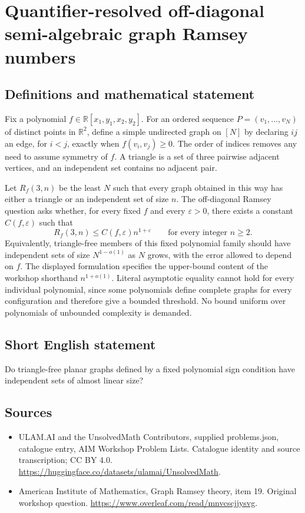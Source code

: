 \documentclass[11pt,a4paper]{article}
\begin{document}
\section*{Quantifier-resolved off-diagonal semi-algebraic graph Ramsey numbers}\label{statement}

\subsection{Definitions and mathematical statement}
Fix a polynomial $f\in\mathbb R[x_1,y_1,x_2,y_2]$.
For an ordered sequence $P=(v_1,\ldots,v_N)$ of distinct points in $\mathbb R^2$, define a simple undirected graph on $[N]$ by declaring $ij$ an edge, for $i<j$, exactly when $f(v_i,v_j)\geq0$.
The order of indices removes any need to assume symmetry of $f$.
A triangle is a set of three pairwise adjacent vertices, and an independent set contains no adjacent pair.

Let $R_f(3,n)$ be the least $N$ such that every graph obtained in this way has either a triangle or an independent set of size $n$.
The off-diagonal Ramsey question asks whether, for every fixed $f$ and every $\varepsilon>0$, there exists a constant $C(f,\varepsilon)$ such that
\[
 R_f(3,n)\leq C(f,\varepsilon)n^{1+\varepsilon}
 \qquad\text{for every integer }n\geq2.
\]
Equivalently, triangle-free members of this fixed polynomial family should have independent sets of size $N^{1-o(1)}$ as $N$ grows, with the error allowed to depend on $f$.
The displayed formulation specifies the upper-bound content of the workshop shorthand $n^{1+o(1)}$.
Literal asymptotic equality cannot hold for every individual polynomial, since some polynomials define complete graphs for every configuration and therefore give a bounded threshold.
No bound uniform over polynomials of unbounded complexity is demanded.
\subsection{Short English statement}
Do triangle-free planar graphs defined by a fixed polynomial sign condition have independent sets of almost linear size?
\subsection{Sources}
\begin{itemize}
\item[S1] ULAM.AI and the UnsolvedMath Contributors, supplied problems.json, catalogue entry, AIM Workshop Problem Lists. Catalogue identity and source transcription; CC BY 4.0.
\url{https://huggingface.co/datasets/ulamai/UnsolvedMath}.
\item[S2] American Institute of Mathematics, Graph Ramsey theory, item 19. Original workshop question.
\url{https://www.overleaf.com/read/mnvcscjjysvg}.
\end{itemize}
\end{document}
